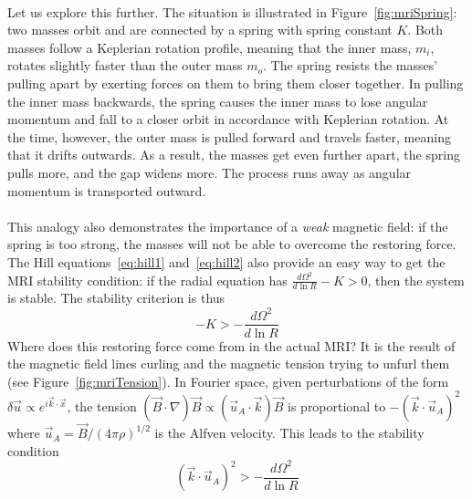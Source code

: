\\
Let us explore this further. The situation is illustrated in Figure~\ref{fig:mriSpring}: two masses orbit and are connected by a spring with spring constant $K$. Both masses follow a Keplerian rotation profile, meaning that the inner mass, $m_i$, rotates slightly faster than the outer mass $m_o$. The spring resists the masses' pulling apart by exerting forces on them to bring them closer together. In pulling the inner mass backwards, the spring causes the inner mass to lose angular momentum and fall to a closer orbit in accordance with Keplerian rotation. At the time, however, the outer mass is pulled forward and travels faster, meaning that it drifts outwards. As a result, the masses get even further apart, the spring pulls more, and the gap widens more. The process runs away as angular momentum is transported outward. \\
\\
This analogy also demonstrates the importance of a \textit{weak} magnetic field: if the spring is too strong, the masses will not be able to overcome the restoring force. The Hill equations~\ref{eq:hill1} and~\ref{eq:hill2} also provide an easy way to get the MRI stability condition: if the radial equation has $\frac{d\Omega^2}{d\ln R}-K>0$, then the system is stable. The stability criterion is thus
\begin{equation*}
-K>-\frac{d\Omega^2}{d\ln R}
\end{equation*}
Where does this restoring force come from in the actual MRI? It is the result of the magnetic field lines curling and the magnetic tension trying to unfurl them (see Figure~\ref{fig:mriTension}). In Fourier space, given perturbations of the form $\delta\vec u\propto e^{i\vec k\cdot\vec x}$, the tension $(\vec B\cdot\nabla)\vec B\propto (\vec u_A\cdot \vec k)\vec B$ is proportional to $-(\vec k\cdot\vec u_A)^2$ where $\vec u_A=\vec B/(4\pi\rho)^{1/2}$ is the Alfven velocity. This leads to the stability condition
\begin{equation}
(\vec k\cdot\vec u_A)^2 >-\frac{d\Omega^2}{d\ln R} \label{eq:mriStable}
\end{equation}
